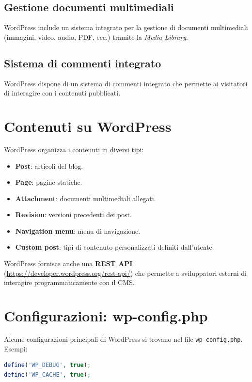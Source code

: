 \subsection{Gestione documenti multimediali}

WordPress include un sistema integrato per la gestione di documenti multimediali (immagini, video, audio, PDF, ecc.) tramite la \emph{Media Library}.

\subsection{Sistema di commenti integrato}

WordPress dispone di un sistema di commenti integrato che permette ai visitatori di interagire con i contenuti pubblicati.

\section{Contenuti su WordPress}

WordPress organizza i contenuti in diversi tipi:

\begin{itemize}
    \item \textbf{Post}: articoli del blog.
    \item \textbf{Page}: pagine statiche.
    \item \textbf{Attachment}: documenti multimediali allegati.
    \item \textbf{Revision}: versioni precedenti dei post.
    \item \textbf{Navigation menu}: menu di navigazione.
    \item \textbf{Custom post}: tipi di contenuto personalizzati definiti dall'utente.
\end{itemize}

WordPress fornisce anche una \textbf{REST API} (\url{https://developer.wordpress.org/rest-api/}) che permette a sviluppatori esterni di interagire programmaticamente con il CMS.

\section{Configurazioni: wp-config.php}

Alcune configurazioni principali di WordPress si trovano nel file \texttt{wp-config.php}. Esempi:

\begin{lstlisting}[language=PHP]
define('WP_DEBUG', true);
define('WP_CACHE', true);
\end{lstlisting}

